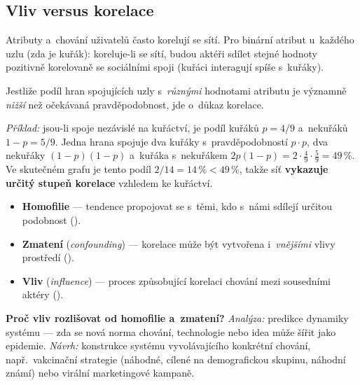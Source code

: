 \documentclass[11pt,a4paper]{article}
\theoremstyle{definition}
\begin{document}
\subsection{Vliv versus korelace}

Atributy a~chování uživatelů často korelují se sítí. Pro binární atribut u~každého uzlu (zda je
kuřák): koreluje-li se sítí, budou aktéři sdílet stejné hodnoty pozitivně korelovaně se
sociálními spoji (kuřáci interagují spíše s~kuřáky).

\begin{defbox}
Jestliže podíl hran spojujících uzly s~\emph{různými} hodnotami atributu je významně
\emph{nižší} než očekávaná pravděpodobnost, jde o~důkaz korelace.

\emph{Příklad:} jsou-li spoje nezávislé na kuřáctví, je podíl kuřáků $p=4/9$ a~nekuřáků
$1-p=5/9$. Jedna hrana spojuje dva kuřáky s~pravděpodobností $p\cdot p$, dva nekuřáky
$(1-p)(1-p)$ a~kuřáka s~nekuřákem $2p(1-p)=2\cdot\frac49\cdot\frac59=49\,\%$. Ve
skutečném grafu je tento podíl $2/14=14\,\%<49\,\%$, takže síť \textbf{vykazuje určitý stupeň
korelace} vzhledem ke kuřáctví.
\end{defbox}

\begin{defbox}
\begin{itemize}
\item \textbf{Homofilie} --- tendence propojovat se s~těmi, kdo s~námi sdílejí určitou
      podobnost ().
\item \textbf{Zmatení} (\emph{confounding}) --- korelace může být vytvořena i~\emph{vnějšími}
      vlivy prostředí ().
\item \textbf{Vliv} (\emph{influence}) --- proces způsobující korelaci chování mezi sousedními
      aktéry ().
\end{itemize}
\textbf{Proč vliv rozlišovat od homofilie a~zmatení?} \emph{Analýza:} predikce dynamiky
systému --- zda se nová norma chování, technologie nebo idea může šířit jako epidemie.
\emph{Návrh:} konstrukce systému vyvolávajícího konkrétní chování, např.\ vakcinační strategie
(náhodné, cílené na demografickou skupinu, náhodní známí) nebo virální marketingové kampaně.
\end{defbox}
\end{document}

